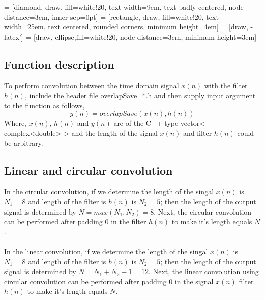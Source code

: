 %


 = [diamond, draw, fill=white!20, 
text width=9em, text badly centered, node distance=3cm, inner sep=0pt]
 = [rectangle, draw, fill=white!20,
text width=25em, text centered, rounded corners, minimum height=4em]
 = [draw, -latex']
 = [draw, ellipse,fill=white!20, node distance=3cm,
minimum height=3em]

\newpage
\subsection*{Function description}
To perform convolution between the time domain signal $x(n)$ with the filter $h(n)$, include the header file overlapSave\_*.h and then supply input argument to the function as follows,
 \begin{equation*}
 y(n) = overlapSave(x(n),h(n))
 \end{equation*}
Where, $x(n)$, $h(n)$ and $y(n)$ are of the C++ type vector< complex<double> > and the length of the signal $x(n)$ and filter  $h(n)$ could be arbitrary.
\subsection*{Linear and circular convolution}
In the circular convolution, if we determine the length of the singal $x(n)$ is $N_{1} = 8$ and length of the filter is  $h(n)$ is $N_{2} = 5$; then the length of the output signal is determined by $N = max(N_{1} , N_{2} )=8$. Next, the circular convolution can be performed after padding $0$ in the filter $h(n)$ to make it's length equals $N$. \\ \\
In the linear convolution, if we determine the length of the singal $x(n)$ is $N_{1} = 8$ and length of the filter is  $h(n)$ is $N_{2} = 5$; then the length of the output signal is determined by $N = N_{1}+N_{2}-1 = 12$. Next, the linear convolution using circular convolution can be performed after padding $0$ in the signal $x(n)$ filter $h(n)$ to make it's length equals $N$.

